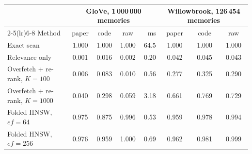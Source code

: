 \begin{tabular}{l ccc r ccc}
\toprule
 & \multicolumn{4}{c}{GloVe, 1\,000\,000 memories} & \multicolumn{3}{c}{Willowbrook, 126\,454 memories}\\
\cmidrule(lr){2-5}\cmidrule(lr){6-8}
Method & paper & code & raw & ms & paper & code & raw\\
\midrule
Exact scan & 1.000 & 1.000 & 1.000 & 64.5 & 1.000 & 1.000 & 1.000\\
Relevance only & 0.001 & 0.016 & 0.002 & 0.20 & 0.042 & 0.045 & 0.043\\
Overfetch + re-rank, $K=100$ & 0.006 & 0.083 & 0.010 & 0.56 & 0.277 & 0.325 & 0.290\\
Overfetch + re-rank, $K=1000$ & 0.040 & 0.298 & 0.059 & 3.18 & 0.661 & 0.769 & 0.729\\
Folded HNSW, $ef=64$ & 0.975 & 0.875 & 0.996 & 0.53 & 0.959 & 0.978 & 0.994\\
Folded HNSW, $ef=256$ & 0.976 & 0.959 & 1.000 & 0.69 & 0.962 & 0.981 & 0.999\\
\bottomrule
\end{tabular}
